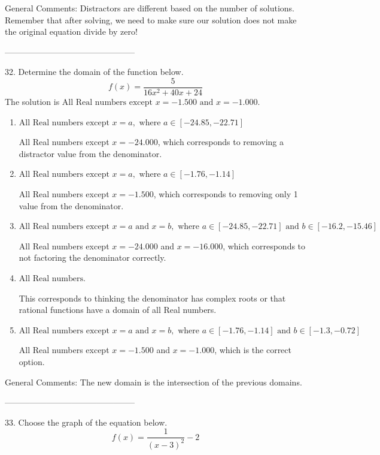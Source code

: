 \documentclass{article}[14pt]
\begin{document}
General Comments: Distractors are different based on the number of solutions. Remember that after solving, we need to make sure our solution does not make the original equation divide by zero!

-----------------------------------------------

32. Determine the domain of the function below.
$$ f(x) = \frac{5}{16x^{2} +40 x + 24} $$ 
The solution is $ \text{All Real numbers except } x = -1.500 \text{ and } x = -1.000. $ 

\begin{enumerate}[label=\Alph*.] 
\item $ \text{All Real numbers except } x = a, \text{ where } a \in [-24.85, -22.71] $ 

 All Real numbers except $x = -24.000$, which corresponds to removing a distractor value from the denominator. 
\item $ \text{All Real numbers except } x = a, \text{ where } a \in [-1.76, -1.14] $ 

 All Real numbers except $x = -1.500$, which corresponds to removing only 1 value from the denominator. 
\item $ \text{All Real numbers except } x = a \text{ and } x = b, \text{ where } a \in [-24.85, -22.71] \text{ and } b \in [-16.2, -15.46] $ 

 All Real numbers except $x = -24.000$ and $x = -16.000$, which corresponds to not factoring the denominator correctly. 
\item $ \text{All Real numbers.} $ 

 This corresponds to thinking the denominator has complex roots or that rational functions have a domain of all Real numbers. 
\item $ \text{All Real numbers except } x = a \text{ and } x = b, \text{ where } a \in [-1.76, -1.14] \text{ and } b \in [-1.3, -0.72] $ 

 All Real numbers except $x = -1.500$ and $x = -1.000$, which is the correct option. 
\end{enumerate} 
 
General Comments: The new domain is the intersection of the previous domains.

-----------------------------------------------

33. Choose the graph of the equation below.
$$ f(x) = \frac{1}{(x - 3)^2} - 2 $$ 
\end{document}

